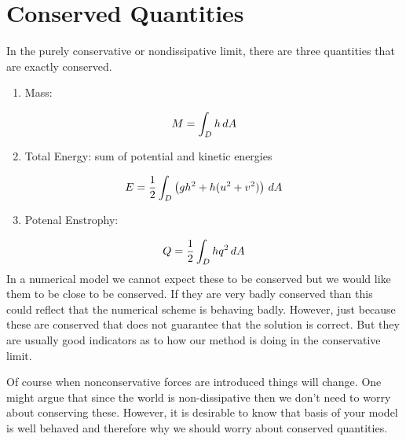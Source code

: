\documentclass[letterpaper,10pt,english]{sphinxmanual}
\begin{document}
\section{Conserved Quantities}
\label{sw_intro:conserved-quantities}
In the purely conservative or nondissipative limit, there are three
quantities that are exactly conserved.
\begin{enumerate}
\item {} 
Mass:

\end{enumerate}
\begin{gather}
\begin{split}M = \int_D h \, dA\end{split}\notag
\end{gather}\begin{enumerate}
\setcounter{enumi}{1}
\item {} 
Total Energy: sum of potential and kinetic energies

\end{enumerate}
\begin{gather}
\begin{split}E = \frac12 \int_D \left(g h^2 + h( u^2 + v^2)\right) \, dA\end{split}\notag
\end{gather}\begin{enumerate}
\setcounter{enumi}{2}
\item {} 
Potenal Enstrophy:

\end{enumerate}
\begin{gather}
\begin{split}Q = \frac12 \int_D  h q^2 \, dA\end{split}\notag
\end{gather}
In a numerical model we cannot expect these to be conserved but we would
like them to be close to be conserved. If they are very badly conserved
than this could reflect that the numerical scheme is behaving badly.
However, just because these are conserved that does not guarantee that
the solution is correct. But they are usually good indicators as to how
our method is doing in the conservative limit.

Of course when nonconservative forces are introduced things will change.
One might argue that since the world is non-dissipative then we don’t
need to worry about conserving these. However, it is desirable to know
that basis of your model is well behaved and therefore why we should
worry about conserved quantities.
\end{document}
